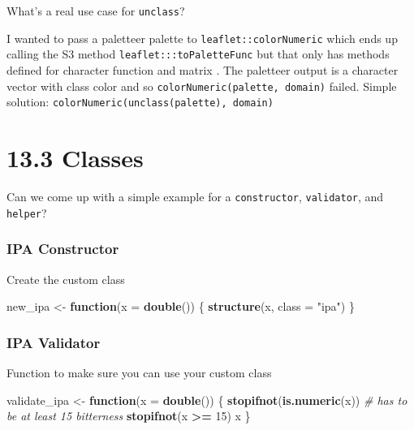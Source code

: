 \documentclass[]{book}
\newenvironment{Shaded}{\begin{snugshade}}{\end{snugshade}}
\newcommand{\CommentTok}[1]{\textcolor[rgb]{0.56,0.35,0.01}{\textit{#1}}}
\newcommand{\ControlFlowTok}[1]{\textcolor[rgb]{0.13,0.29,0.53}{\textbf{#1}}}
\newcommand{\DataTypeTok}[1]{\textcolor[rgb]{0.13,0.29,0.53}{#1}}
\newcommand{\DecValTok}[1]{\textcolor[rgb]{0.00,0.00,0.81}{#1}}
\newcommand{\KeywordTok}[1]{\textcolor[rgb]{0.13,0.29,0.53}{\textbf{#1}}}
\newcommand{\NormalTok}[1]{#1}
\newcommand{\OperatorTok}[1]{\textcolor[rgb]{0.81,0.36,0.00}{\textbf{#1}}}
\newcommand{\StringTok}[1]{\textcolor[rgb]{0.31,0.60,0.02}{#1}}
\begin{document}
What's a real use case for \texttt{unclass}?

I wanted to pass a paletteer palette to \texttt{leaflet::colorNumeric} which ends up calling the S3 method \texttt{leaflet:::toPaletteFunc} but that only has methods defined for character function and matrix . The paletteer output is a character vector with class color and so \texttt{colorNumeric(palette,\ domain)} failed. Simple solution: \texttt{colorNumeric(unclass(palette),\ domain)}

\hypertarget{classes}{%
\section*{13.3 Classes}\label{classes}}

Can we come up with a simple example for a \texttt{constructor}, \texttt{validator}, and \texttt{helper}?

\hypertarget{ipa-constructor}{%
\subsubsection*{IPA Constructor}\label{ipa-constructor}}

Create the custom class

\begin{Shaded}
\begin{Highlighting}[]
\NormalTok{new_ipa <-}\StringTok{ }\ControlFlowTok{function}\NormalTok{(}\DataTypeTok{x =} \KeywordTok{double}\NormalTok{()) \{}
  \KeywordTok{structure}\NormalTok{(x, }\DataTypeTok{class =} \StringTok{"ipa"}\NormalTok{)}
\NormalTok{\}}
\end{Highlighting}
\end{Shaded}

\hypertarget{ipa-validator}{%
\subsubsection*{IPA Validator}\label{ipa-validator}}

Function to make sure you can use your custom class

\begin{Shaded}
\begin{Highlighting}[]
\NormalTok{validate_ipa <-}\StringTok{ }\ControlFlowTok{function}\NormalTok{(}\DataTypeTok{x =} \KeywordTok{double}\NormalTok{()) \{}
  \KeywordTok{stopifnot}\NormalTok{(}\KeywordTok{is.numeric}\NormalTok{(x))}
  \CommentTok{# has to be at least 15 bitterness}
  \KeywordTok{stopifnot}\NormalTok{(x }\OperatorTok{>=}\StringTok{ }\DecValTok{15}\NormalTok{)}
\NormalTok{  x}
\NormalTok{\}}
\end{Highlighting}
\end{Shaded}
\end{document}
